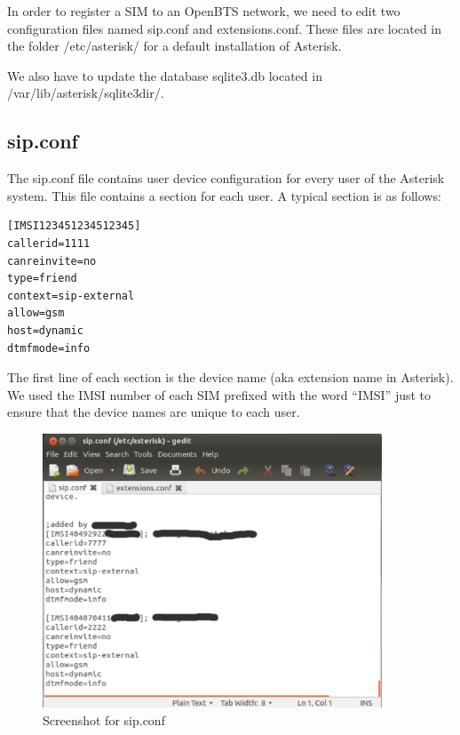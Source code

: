 In order to register a SIM to an OpenBTS network, we need to edit two 
configuration files named \textsf{sip.conf} and \textsf{extensions.conf}. These
files are located in the folder \textsf{/etc/asterisk/} for a default 
installation of Asterisk.

We also have to update the database \textsf{sqlite3.db} located in
\textsf{/var/lib/asterisk/sqlite3dir/}.

\subsection{sip.conf}

The \textsf{sip.conf} file contains user device configuration for every user of 
the Asterisk system. This file contains a section for each user. A typical 
section is as follows:
\begin{verbatim}
[IMSI123451234512345]
callerid=1111
canreinvite=no
type=friend
context=sip-external
allow=gsm
host=dynamic
dtmfmode=info    
\end{verbatim}

The first line of each section is the device name (aka extension name in
Asterisk). We used the IMSI number of each SIM prefixed with the word ``IMSI''
just to ensure that the device names are unique to each user.

\begin{figure}
  \centering
    \includegraphics[width=0.9\textwidth]{../images/sip_conf}
  \caption[Screenshot - sip.conf]{Screenshot for \textsf{sip.conf}}
  \label{sip_conf}
\end{figure}

